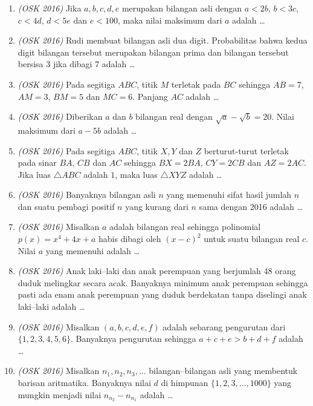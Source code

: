 \documentclass[11pt]{scrartcl}
\begin{document}
\begin{enumerate}
\item \textit{(OSK 2016)} Jika $a,b,c,d,e$ merupakan bilangan asli dengan $a < 2b$, $b < 3c$, $c < 4d$, $d < 5e$ dan $e < 100$, maka nilai maksimum dari $a$ adalah \dots

\item \textit{(OSK 2016)} Rudi membuat bilangan asli dua digit. Probabilitas bahwa kedua digit bilangan tersebut merupakan bilangan prima dan bilangan tersebut bersisa 3 jika dibagi 7 adalah \dots

\item \textit{(OSK 2016)} Pada segitiga $ABC$, titik $M$ terletak pada $BC$ sehingga $AB = 7$, $AM = 3$, $BM = 5$ dan $MC = 6$. Panjang $AC$ adalah \dots

\item \textit{(OSK 2016)} Diberikan $a$ dan $b$ bilangan real dengan $\sqrt{a} - \sqrt{b} = 20$. Nilai maksimum dari $a - 5b$ adalah \dots

\item \textit{(OSK 2016)} Pada segitiga $ABC$, titik $X,Y$ dan $Z$ berturut-turut terletak pada sinar $BA$, $CB$ dan $AC$ sehingga $BX = 2BA$, $CY = 2CB$ dan $AZ = 2AC$. Jika luas $\triangle ABC$ adalah $1$, maka luas $\triangle XYZ$ adalah \dots

\item \textit{(OSK 2016)} Banyaknya bilangan asli $n$ yang memenuhi sifat hasil jumlah $n$ dan suatu pembagi positif $n$ yang kurang dari $n$ sama dengan 2016 adalah \dots

\item \textit{(OSK 2016)} Misalkan $a$ adalah bilangan real sehingga polinomial $p(x) = x^4 + 4x + a$ habis dibagi oleh $(x - c)^2$ untuk suatu bilangan real $c$. Nilai $a$ yang memenuhi adalah \dots

\item \textit{(OSK 2016)} Anak laki–laki dan anak perempuan yang berjumlah 48 orang duduk melingkar secara acak. Banyaknya minimum anak perempuan sehingga pasti ada enam anak perempuan yang duduk berdekatan tanpa diselingi anak laki–laki adalah \dots

\item \textit{(OSK 2016)} Misalkan $(a,b,c,d,e,f)$ adalah sebarang pengurutan dari $\{1,2,3,4,5,6\}$. Banyaknya pengurutan sehingga $a + c + e > b + d + f$ adalah \dots

\item \textit{(OSK 2016)} Misalkan $n_1, n_2, n_3, \dots$ bilangan–bilangan asli yang membentuk barisan aritmatika. Banyaknya nilai $d$ di himpunan $\{1,2,3,\dots,1000\}$ yang mungkin menjadi nilai $n_{n_2} - n_{n_1}$ adalah \dots


\end{enumerate}
\end{document}
